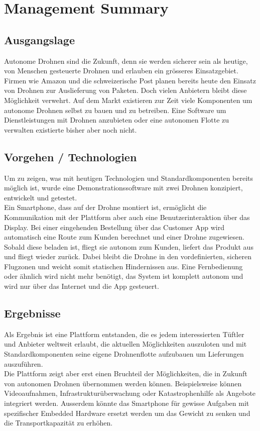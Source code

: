 \newpage
{}
\chapter*{Management Summary}
\section*{Ausgangslage}
Autonome Drohnen sind die Zukunft, denn sie werden sicherer sein als heutige, von Menschen gesteuerte Drohnen und erlauben ein grösseres Einsatzgebiet. Firmen wie Amazon und die schweizerische Post planen bereits heute den Einsatz von Drohnen zur Auslieferung von Paketen. Doch vielen Anbietern bleibt diese Möglichkeit verwehrt. Auf dem Markt existieren zur Zeit viele Komponenten um autonome Drohnen selbst zu bauen und zu betreiben. Eine Software um Dienstleistungen mit Drohnen anzubieten oder eine autonomen Flotte zu verwalten existierte bisher aber noch nicht.

\section*{Vorgehen / Technologien}
Um zu zeigen, was mit heutigen Technologien und Standardkomponenten bereits möglich ist, wurde eine Demonstrationssoftware mit zwei Drohnen konzipiert, entwickelt und getestet. \\
Ein Smartphone, dass auf der Drohne montiert ist, ermöglicht die Kommunikation mit der Plattform aber auch eine Benutzerinteraktion über das Display. Bei einer eingehenden Bestellung über das Customer App wird automatisch eine Route zum Kunden berechnet und einer Drohne zugewiesen. Sobald diese beladen ist, fliegt sie autonom zum Kunden, liefert das Produkt aus und fliegt wieder zurück. Dabei bleibt die Drohne in den vordefinierten, sicheren Flugzonen und weicht somit statischen Hindernissen aus. Eine Fernbedienung oder ähnlich wird nicht mehr benötigt, das System ist komplett autonom und wird nur über das Internet und die App gesteuert.

\section*{Ergebnisse}
Als Ergebnis ist eine Plattform entstanden, die es jedem interessierten Tüftler und Anbieter weltweit erlaubt, die aktuellen Möglichkeiten auszuloten und mit Standardkomponenten seine eigene Drohnenflotte aufzubauen um Lieferungen auszuführen.
\\
Die Plattform zeigt aber erst einen Bruchteil der Möglichkeiten, die in Zukunft von autonomen Drohnen übernommen werden können. Beispielsweise können Videoaufnahmen, Infrastrukturüberwachung oder Katastrophenhilfe als Angebote integriert werden. Ausserdem könnte das Smartphone für gewisse Aufgaben mit spezifischer Embedded Hardware ersetzt werden um das Gewicht zu senken und die Transportkapazität zu erhöhen. 